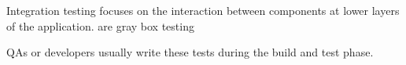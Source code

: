 Integration testing 
  focuses on the interaction between components at lower layers of the application. 
  are gray box testing 

  QAs or developers usually write these tests during the build and test phase. 